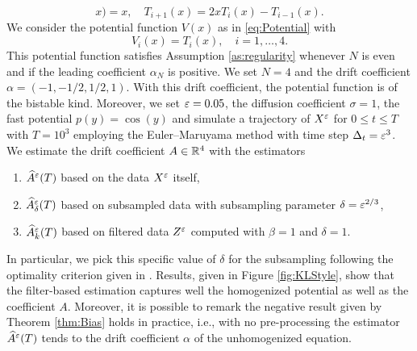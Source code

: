 \documentclass[10pt]{article}
\begin{document}
\begin{equation}
x) = x, \quad T_{i+1}(x) = 2xT_i(x) - T_{i-1}(x).
\end{equation}
We consider the potential function $V(x)$ as in \eqref{eq:Potential} with
\begin{equation}
V_i(x) = T_i(x), \quad i =1, \ldots, 4.
\end{equation}
This potential function satisfies Assumption \ref{as:regularity} whenever $N$ is even and if the leading coefficient $\alpha_N$ is positive. We set $N = 4$ and the drift coefficient $\alpha = (-1, -1/2, 1/2, 1)$. With this drift coefficient, the potential function is of the bistable kind. Moreover, we set $\varepsilon = 0.05$, the diffusion coefficient $\sigma = 1$, the fast potential $p(y) = \cos(y)$ and simulate a trajectory of $X^\varepsilon$ for $0 \leq t \leq T$ with $T = 10^3$ employing the Euler--Maruyama method with time step $\Delta_t = \varepsilon^3$. We estimate the drift coefficient $A \in \mathbb{R}^4$ with the estimators
\begin{enumerate}
	\item $\widehat A^\varepsilon(T)$ based on the data $X^\varepsilon$ itself,
	\item $\widehat A^\varepsilon_\delta(T)$ based on subsampled data with subsampling parameter $\delta = \varepsilon^{2/3}$,
	\item $\widehat A^\varepsilon_k(T)$ based on filtered data $Z^\varepsilon$ computed with $\beta = 1$ and $\delta = 1$.
\end{enumerate}
In particular, we pick this specific value of $\delta$ for the subsampling following the optimality criterion given in \cite{PaS07}. Results, given in Figure \ref{fig:KLStyle}, show that the filter-based estimation captures well the homogenized potential as well as the coefficient $A$. Moreover, it is possible to remark the negative result given by Theorem \ref{thm:Bias} holds in practice, i.e., with no pre-processing the estimator $\widehat A^\varepsilon(T)$ tends to the drift coefficient $\alpha$ of the unhomogenized equation.
\end{document}
